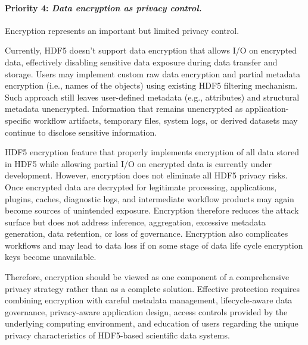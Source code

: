 \documentclass[../main.tex]{subfiles}
\begin{document}
\paragraph{Priority 4: \emph{Data encryption as privacy control.}}
Encryption represents an important but limited privacy control. 

Currently, HDF5 doesn’t support data encryption that allows I/O on encrypted 
data, effectively disabling sensitive data exposure during data 
transfer and storage. Users may implement custom raw data encryption 
and partial metadata encryption (i.e., names of the objects) using 
existing HDF5 filtering mechanism. Such approach still leaves user-defined 
metadata (e.g., attributes) and structural metadata unencrypted. Information 
that remains unencrypted as application-specific workflow artifacts, 
temporary files, system logs, or derived datasets may continue to 
disclose sensitive information.
  
HDF5 encryption feature that properly implements encryption of all data 
stored in HDF5 while allowing partial I/O on encrypted data is currently 
under development. However, encryption does not eliminate all HDF5 privacy risks. 
Once encrypted data are decrypted for legitimate processing, applications, 
plugins, caches, diagnostic logs, and intermediate workflow products may again 
become sources of unintended exposure. Encryption therefore reduces the attack 
surface but does not address inference, aggregation, excessive metadata 
generation, data retention, or loss of governance. Encryption also complicates 
workflows and may lead to data loss if on some stage of data life cycle 
encryption keys become unavailable.

Therefore, encryption should be viewed as one component of a comprehensive 
privacy strategy rather than as a complete solution. Effective protection 
requires combining encryption with careful metadata management, lifecycle-aware 
data governance, privacy-aware application design, access controls provided by 
the underlying computing environment, and education of users regarding the 
unique privacy characteristics of HDF5-based scientific data systems.
\end{document}
